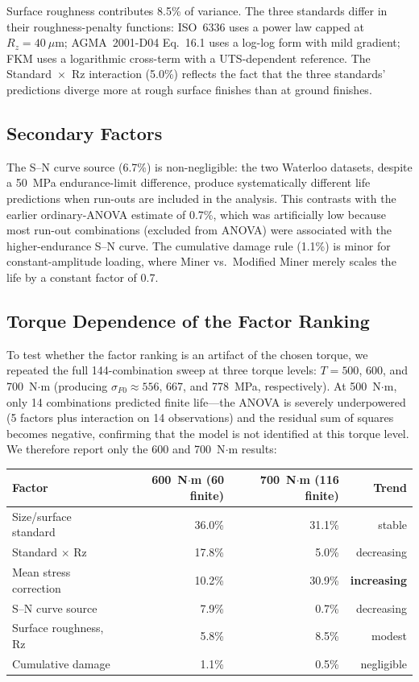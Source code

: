 \documentclass[12pt,a4paper]{article}
\begin{document}
Surface roughness contributes 8.5\% of variance. The three standards
differ in their roughness-penalty functions: ISO~6336 uses a power law
capped at $R_z=40~\mu$m; AGMA~2001-D04 Eq.~16.1 uses a log-log form
with mild gradient; FKM uses a logarithmic cross-term with a UTS-dependent
reference. The Standard~$\times$~Rz interaction (5.0\%) reflects the
fact that the three standards' predictions diverge more at rough surface
finishes than at ground finishes.

\subsection{Secondary Factors}

The S--N curve source (6.7\%) is non-negligible: the two Waterloo
datasets, despite a 50~MPa endurance-limit difference, produce
systematically different life predictions when run-outs are included
in the analysis. This contrasts with the earlier ordinary-ANOVA
estimate of 0.7\%, which was artificially low because most run-out
combinations (excluded from ANOVA) were associated with the
higher-endurance S--N curve. The cumulative damage rule (1.1\%) is
minor for constant-amplitude loading, where Miner vs.\ Modified
Miner merely scales the life by a constant factor of 0.7.

\subsection{Torque Dependence of the Factor Ranking}
\label{sec:torque}

To test whether the factor ranking is an artifact of the chosen torque,
we repeated the full 144-combination sweep at three torque levels:
$T = 500$, 600, and 700~N$\cdot$m (producing $\sigma_{F0} \approx 556$,
667, and 778~MPa, respectively). At 500~N$\cdot$m, only 14 combinations
predicted finite life---the ANOVA is severely underpowered (5 factors
plus interaction on 14 observations) and the residual sum of squares
becomes negative, confirming that the model is not identified at this
torque level. We therefore report only the 600 and 700~N$\cdot$m
results:

\vspace{4pt}
\noindent\begin{tabular}{lrrr}
\toprule
Factor & 600~N$\cdot$m (60 finite) & 700~N$\cdot$m (116 finite) & Trend \\
\midrule
Size/surface standard & 36.0\% & 31.1\% & stable \\
Standard $\times$ Rz & 17.8\% & 5.0\% & decreasing \\
Mean stress correction & 10.2\% & 30.9\% & \textbf{increasing} \\
S--N curve source & 7.9\% & 0.7\% & decreasing \\
Surface roughness, Rz & 5.8\% & 8.5\% & modest \\
Cumulative damage & 1.1\% & 0.5\% & negligible \\
\bottomrule
\end{tabular}
\vspace{4pt}
\end{document}
